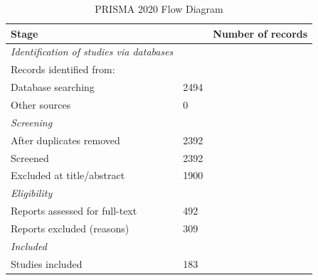 \begin{table}[htbp]
\centering
\caption{PRISMA 2020 Flow Diagram}
\label{tab:prisma-flow}
\begin{tabular}{llr}
\hline
\textbf{Stage} & & \textbf{Number of records} \\ 
\hline
\hline
\textit{Identification of studies via databases} &  &  \\ 
  \hspace{1em} Records identified from: &  &  \\ 
    \hspace{2em} Database searching & 2494 &  \\ 
    \hspace{2em} Other sources & 0 &  \\ 
\hline
\textit{Screening} &  &  \\ 
  \hspace{1em} After duplicates removed & 2392 &  \\ 
  \hspace{1em} Screened & 2392 &  \\ 
  \hspace{1em} Excluded at title/abstract & 1900 &  \\ 
\hline
\textit{Eligibility} &  &  \\ 
  \hspace{1em} Reports assessed for full-text & 492 &  \\ 
  \hspace{1em} Reports excluded (reasons) & 309 &  \\ 
\hline
\textit{Included} &  &  \\ 
  \hspace{1em} Studies included & 183 &  \\ 
\hline
\end{tabular}
\end{table}
